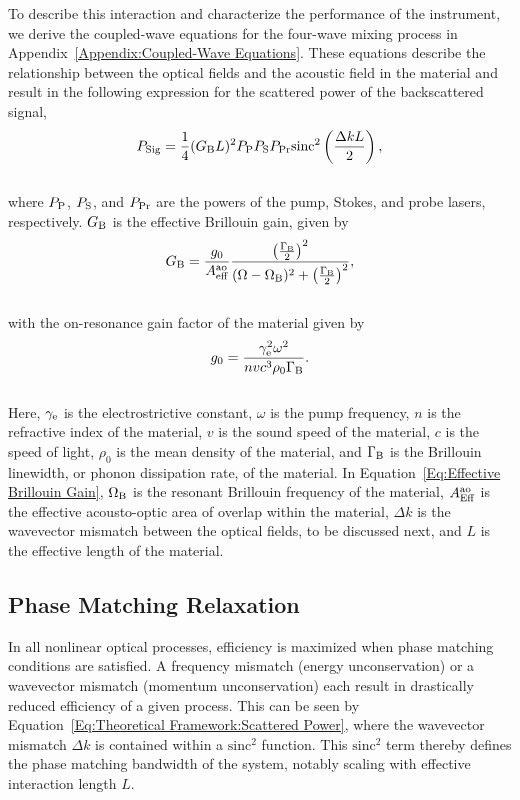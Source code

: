 To describe this interaction and characterize the performance of the instrument, we derive the coupled-wave equations for the four-wave mixing process in Appendix~\ref{Appendix:Coupled-Wave Equations}. These equations describe the relationship between the optical fields and the acoustic field in the material and result in the following expression for the scattered power of the backscattered signal,
\\
\begin{equation}
  P_{\rm Sig} = \frac{1}{4}(G_{\rm B}L)^{2}P_{\rm P}P_{\rm S}P_{\rm Pr}\mathrm{sinc}^{2}\left(\frac{\Delta kL}{2}\right),
  \label{Eq:Theoretical Framework:Scattered Power}
\end{equation}
\\
where \(P_{\rm P}\), \(P_{\rm S}\), and \(P_{\rm Pr}\) are the powers of the pump, Stokes, and probe lasers, respectively. \(G_{\rm B}\) is the effective Brillouin gain, given by
\\
\begin{equation}
  G_{\rm B} = \frac{g_{0}}{A_{\rm eff}^{\rm ao}}\frac{\left(\frac{\Gamma_{\rm B}}{2}\right)^{2}}{(\Omega - \Omega_{\rm B})^{2} + \left(\frac{\Gamma_{\rm B}}{2}\right)^{2}},
  \label{Eq:Effective Brillouin Gain}
\end{equation}
\\
with the on-resonance gain factor of the material given by
\\
\begin{equation}
  g_{0} = \frac{\gamma_{\rm e}^{2}\omega^{2}}{nvc^{3}\rho_{0}\Gamma_{\rm B}}.
\end{equation}
\\
Here, \(\gamma_{\rm e}\) is the electrostrictive constant, \(\omega\) is the pump frequency, \(n\) is the refractive index of the material, \(v\) is the sound speed of the material, \(c\) is the speed of light, \(\rho_0\) is the mean density of the material, and \(\Gamma_{\rm B}\) is the Brillouin linewidth, or phonon dissipation rate, of the material. In Equation~\ref{Eq:Effective Brillouin Gain}, \(\Omega_{\rm B}\) is the resonant Brillouin frequency of the material, \(A_{\rm Eff}^{\rm ao}\) is the effective acousto-optic area of overlap within the material, \(\Delta k\) is the wavevector mismatch between the optical fields, to be discussed next, and \(L\) is the effective length of the material.


\subsection{Phase Matching Relaxation}
\label{Theoretical Framework: Phase matching relaxation}
In all nonlinear optical processes, efficiency is maximized when phase matching conditions are satisfied. A frequency mismatch (energy unconservation) or a wavevector mismatch (momentum unconservation) each result in drastically reduced efficiency of a given process. \cite{maker1962effects} This can be seen by Equation~\ref{Eq:Theoretical Framework:Scattered Power}, where the wavevector mismatch \(\Delta k\) is contained within a \(\mathrm{sinc^2}\) function. This \(\mathrm{sinc^2}\) term thereby defines the phase matching bandwidth of the system, notably scaling with effective interaction length \(L\).

